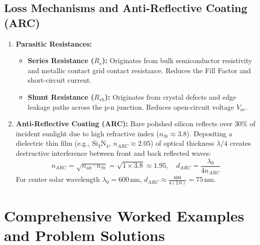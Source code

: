 \subsection{Loss Mechanisms and Anti-Reflective Coating (ARC)}
\begin{enumerate}
    \item \textbf{Parasitic Resistances:}
    \begin{itemize}
        \item \textbf{Series Resistance ($R_s$):} Originates from bulk semiconductor resistivity and metallic contact grid contact resistance. Reduces the Fill Factor and short-circuit current.
        \item \textbf{Shunt Resistance ($R_{sh}$):} Originates from crystal defects and edge leakage paths across the p-n junction. Reduces open-circuit voltage $V_{oc}$.
    \end{itemize}
    \item \textbf{Anti-Reflective Coating (ARC):} Bare polished silicon reflects over $30\%$ of incident sunlight due to high refractive index ($n_{Si} \approx 3.8$). Depositing a dielectric thin film (e.g., $\text{Si}_3\text{N}_4$, $n_{ARC} \approx 2.05$) of optical thickness $\lambda/4$ creates destructive interference between front and back reflected waves:
    \begin{equation}
        n_{ARC} = \sqrt{n_{\text{air}} \cdot n_{Si}} = \sqrt{1 \times 3.8} \approx 1.95, \quad d_{ARC} = \frac{\lambda_0}{4 n_{ARC}}
    \end{equation}
    For center solar wavelength $\lambda_0 = 600\,\text{nm}$, $d_{ARC} \approx \frac{600}{4(2.0)} = 75\,\text{nm}$.
\end{enumerate}

\section{Comprehensive Worked Examples and Problem Solutions}

